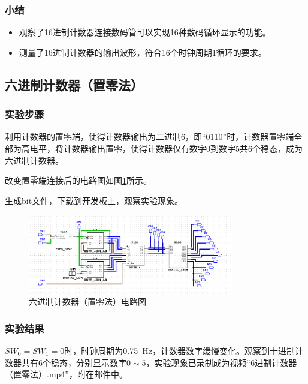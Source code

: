 \documentclass[UTF8]{ctexart}
\numberwithin{figure}{subsection}
\numberwithin{table}{subsection}
\numberwithin{equation}{subsection}
\begin{document}
\subsubsection{小结}
\begin{itemize}
    \item 观察了16进制计数器连接数码管可以实现16种数码循环显示的功能。
    \item 测量了16进制计数器的输出波形，符合16个时钟周期1循环的要求。
\end{itemize}

\subsection{六进制计数器（置零法）}

\subsubsection{实验步骤}
\par 利用计数器的置零端，使得计数器输出为二进制6，即“0110”时，计数器置零端全部为高电平，将计数器输出置零，使得计数器仅有数字0到数字5共6个稳态，成为六进制计数器。
\par 改变置零端连接后的电路图如图\ref{6set0 circuit}所示。
\par 生成bit文件，下载到开发板上，观察实验现象。

\begin{figure}[H]
    \begin{center}
        \includegraphics[width=0.8\textwidth]{6set0/ciruit.png}
    \end{center}
    \caption{六进制计数器（置零法）电路图}
    \label{6set0 circuit}
\end{figure}


\subsubsection{实验结果}
\(SW_0 = SW_1 = 0\)时，时钟周期为\SI{0.75}{\Hz}，计数器数字缓慢变化。观察到十进制计数器共有6个稳态，分别显示数字\(0\sim5\)，实验现象已录制成为视频“6进制计数器（置零法）.mp4”，附在邮件中。
\end{document}

